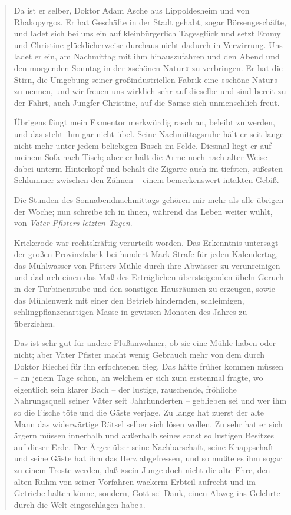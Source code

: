 \begin{verse}
Da ist er selber, Doktor Adam Asche aus Lippoldesheim und von
Rhakopyrgos. Er hat Geschäfte in der Stadt gehabt, sogar
Börsengeschäfte, und ladet sich bei uns ein auf kleinbürgerlich
Tagesglück und setzt Emmy und Christine glücklicherweise durchaus
nicht dadurch in Verwirrung. Uns ladet er ein, am Nachmittag mit
ihm hinauszufahren und den Abend und den morgenden Sonntag in der
»schönen Natur« zu verbringen. Er hat die Stirn, die Umgebung
seiner großindustriellen Fabrik eine »schöne Natur« zu nennen, und
wir freuen uns wirklich sehr auf dieselbe und sind bereit zu der
Fahrt, auch Jungfer Christine, auf die Samse sich unmenschlich
freut.

Übrigens fängt mein Exmentor merkwürdig rasch an, beleibt zu
werden, und das steht ihm gar nicht übel. Seine Nachmittagsruhe
hält er seit lange nicht mehr unter jedem beliebigen Busch im
Felde. Diesmal liegt er auf meinem Sofa nach Tisch; aber er hält
die Arme noch nach alter Weise dabei unterm Hinterkopf und behält
die Zigarre auch im tiefsten, süßesten Schlummer zwischen den
Zähnen – einem bemerkenswert intakten Gebiß.

Die Stunden des Sonnabendnachmittags gehören mir mehr als alle
übrigen der Woche; nun schreibe ich in ihnen, während das Leben
weiter wühlt, von \emph{Vater Pfisters letzten Tagen}.~–

Krickerode war rechtskräftig verurteilt worden. Das Erkenntnis
untersagt der großen Provinzfabrik bei hundert Mark Strafe für
jeden Kalendertag, das Mühlwasser von Pfisters Mühle durch ihre
Abwässer zu verunreinigen und dadurch einen das Maß des
Erträglichen übersteigenden übeln Geruch in der Turbinenstube und
den sonstigen Hausräumen zu erzeugen, sowie das Mühlenwerk mit
einer den Betrieb hindernden, schleimigen, schlingpflanzenartigen
Masse in gewissen Monaten des Jahres zu überziehen.

Das ist sehr gut für andere Flußanwohner, ob sie eine Mühle haben
oder nicht; aber Vater Pfister macht wenig Gebrauch mehr von dem
durch Doktor Riechei für ihn erfochtenen Sieg. Das hätte früher
kommen müssen – an jenem Tage schon, an welchem er sich zum
erstenmal fragte, wo eigentlich sein klarer Bach – der lustige,
rauschende, fröhliche Nahrungsquell seiner Väter seit Jahrhunderten
– geblieben sei und wer ihm so die Fische töte und die Gäste
verjage. Zu lange hat zuerst der alte Mann das widerwärtige Rätsel
selber sich lösen wollen. Zu sehr hat er sich ärgern müssen
innerhalb und außerhalb seines sonst so lustigen Besitzes auf
dieser Erde. Der Ärger über seine Nachbarschaft, seine Knappschaft
und seine Gäste hat ihm das Herz abgefressen, und so mußte es ihm
sogar zu einem Troste werden, daß »sein Junge doch nicht die alte
Ehre, den alten Ruhm von seiner Vorfahren wackerm Erbteil aufrecht
und im Getriebe halten könne, sondern, Gott sei Dank, einen Abweg
ins Gelehrte durch die Welt eingeschlagen habe«.


\end{verse}
